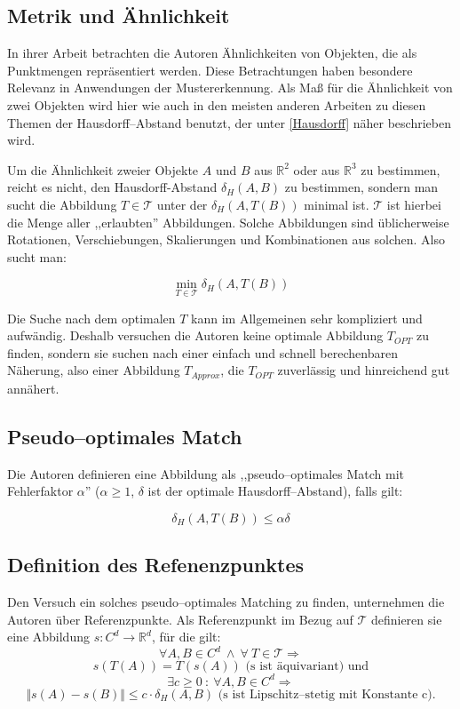 \subsection{Metrik und Ähnlichkeit}

In ihrer Arbeit betrachten die Autoren Ähnlichkeiten von Objekten, die als Punktmengen repräsentiert werden. Diese Betrachtungen haben besondere Relevanz in Anwendungen der Mustererkennung. Als Maß für die Ähnlichkeit von zwei Objekten wird hier wie auch in den meisten anderen Arbeiten zu diesen Themen der Hausdorff--Abstand benutzt, der unter \vref{Hausdorff} näher beschrieben wird.

Um die Ähnlichkeit  zweier Objekte $A$ und $B$ aus $\mathbb{R}^2$ oder aus $\mathbb{R}^3$ zu bestimmen, reicht es nicht, den Hausdorff-Abstand $\delta_H(A,B)$ zu bestimmen, sondern man sucht die Abbildung $T\in\mathcal{T}$ unter der $\delta_H(A,T(B))$ minimal ist. $\mathcal{T}$ ist hierbei die Menge aller ,,erlaubten'' Abbildungen. Solche Abbildungen sind üblicherweise Rotationen, Verschiebungen, Skalierungen und Kombinationen aus solchen. Also sucht man:

$$\min_{T\in\mathcal{T}}\delta_H(A,T(B))$$

Die Suche nach dem optimalen $T$ kann im Allgemeinen sehr kompliziert und aufwändig. Deshalb versuchen die Autoren keine optimale Abbildung $T_{OPT}$ zu finden, sondern sie suchen nach einer einfach und schnell berechenbaren Näherung, also einer Abbildung $T_{Approx}$, die $T_{OPT}$ zuverlässig und hinreichend gut annähert.

\subsection{Pseudo--optimales Match}

Die Autoren definieren eine Abbildung als ,,pseudo--optimales Match mit Fehlerfaktor $\alpha$''  ($\alpha\geq 1$, $\delta$ ist der optimale Hausdorff--Abstand), falls gilt:

$$\delta_H(A,T(B))\leq \alpha \delta$$

\subsection{Definition des Refenenzpunktes}

Den Versuch ein solches pseudo--optimales Matching zu finden, unternehmen die Autoren über Referenzpunkte. Als Referenzpunkt im Bezug auf $\mathcal{T}$ definieren sie eine Abbildung $s:C^d\longrightarrow\mathbb{R}^d$, für die gilt:
$$\forall A, B\in C^d  \:\wedge\: \forall\: T\in\mathcal{T}\Rightarrow$$
$$s(T(A))=T(s(A))\text{ (s ist äquivariant) und}$$
$$\exists c\geq0 \: :\: \forall A, B \in C^d\Rightarrow$$
$$\Vert s(A)-s(B)\Vert\leq c\cdot\delta_H(A,B)\text{ (s ist Lipschitz--stetig mit Konstante c)}.$$

